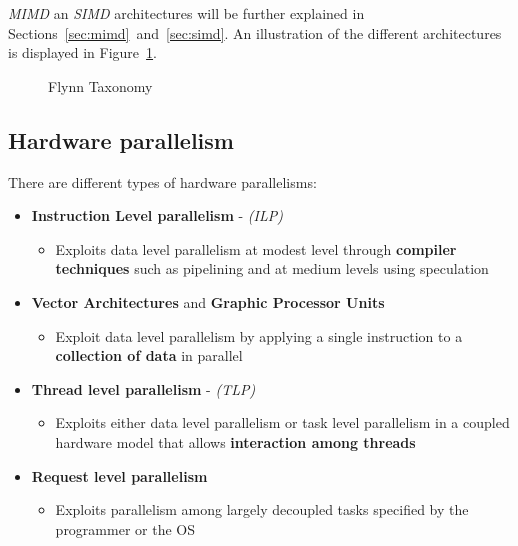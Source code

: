 \documentclass[english]{article}
\begin{document}
\bigskip
\textit{MIMD} an \textit{SIMD} architectures will be further explained in Sections~\ref{sec:mimd}~and~\ref{sec:simd}.
An illustration of the different architectures is displayed in Figure~\ref{fig:flynn-taxonomy}.

\begin{figure}[htbp]
  \bigskip
  \centering
  \caption{Flynn Taxonomy}
  \label{fig:flynn-taxonomy}
  \bigskip
\end{figure}

\clearpage

\subsection{Hardware parallelism}

There are different types of hardware parallelisms:

\begin{itemize}
  \item \textbf{Instruction Level parallelism} - \textit{(ILP)}
        \begin{itemize}
          \item Exploits data level parallelism at modest level through \textbf{compiler techniques} such as pipelining and at medium levels using speculation
        \end{itemize}
  \item \textbf{Vector Architectures} and \textbf{Graphic Processor Units}
        \begin{itemize}
          \item Exploit data level parallelism by applying a single instruction to a \textbf{collection of data} in parallel
        \end{itemize}
  \item \textbf{Thread level parallelism} - \textit{(TLP)}
        \begin{itemize}
          \item Exploits either data level parallelism or task level parallelism in a coupled hardware model that allows \textbf{interaction among threads}
        \end{itemize}
  \item \textbf{Request level parallelism}
        \begin{itemize}
          \item Exploits parallelism among largely decoupled tasks specified by the programmer or the OS
        \end{itemize}
\end{itemize}
\end{document}
